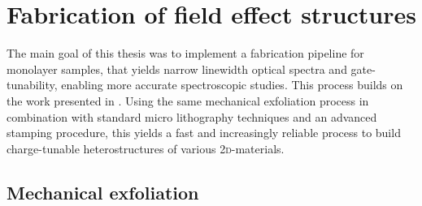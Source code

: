 \chapter{Fabrication of field effect structures}\label{exfoliation}

The main goal of this thesis was to implement a fabrication pipeline for \tmdg monolayer samples, that yields narrow linewidth optical spectra and gate-tunability, enabling more accurate spectroscopic studies. This process builds on the work presented in \cite{funk_spectroscopy_2017}. Using the same mechanical exfoliation process in combination with standard micro lithography techniques and an advanced stamping procedure, this yields a fast and increasingly reliable process to build charge-tunable heterostructures of various \textsc{2d}-materials. 

\section{Mechanical exfoliation}
